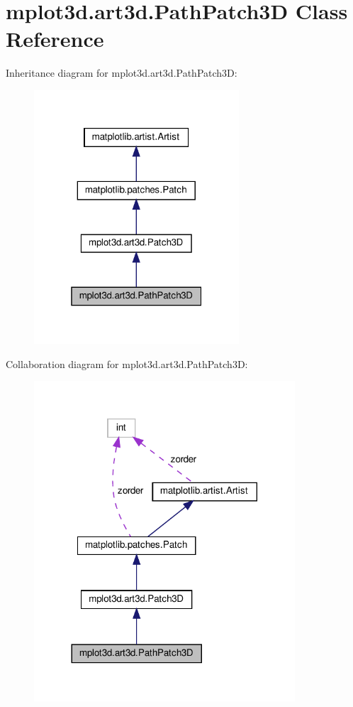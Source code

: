 \hypertarget{classmplot3d_1_1art3d_1_1PathPatch3D}{}\section{mplot3d.\+art3d.\+Path\+Patch3D Class Reference}
\label{classmplot3d_1_1art3d_1_1PathPatch3D}


Inheritance diagram for mplot3d.\+art3d.\+Path\+Patch3D\+:
\nopagebreak
\begin{figure}[H]
\begin{center}
\leavevmode
\includegraphics[width=217pt]{classmplot3d_1_1art3d_1_1PathPatch3D__inherit__graph}
\end{center}
\end{figure}


Collaboration diagram for mplot3d.\+art3d.\+Path\+Patch3D\+:
\nopagebreak
\begin{figure}[H]
\begin{center}
\leavevmode
\includegraphics[width=276pt]{classmplot3d_1_1art3d_1_1PathPatch3D__coll__graph}
\end{center}
\end{figure}
